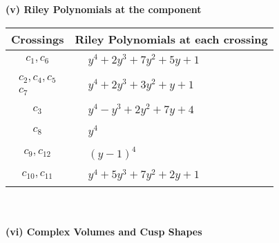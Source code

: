 \documentclass[1p]{elsarticle_modified}
\theoremstyle{definition}
\begin{document}
\newpage\renewcommand{\arraystretch}{1}
\flushleft \textbf{(v) Riley Polynomials at the component}\newline \\
\begin{tabular}{m{50pt}|m{274pt}}
Crossings & \hspace{64pt}Riley Polynomials at each crossing \\
\hline $$\begin{aligned}c_{1},c_{6}\end{aligned}$$&$\begin{aligned}
&y^4+2 y^3+7 y^2+5 y+1
\end{aligned}$\\
\hline $$\begin{aligned}c_{2},c_{4},c_{5}\\c_{7}\end{aligned}$$&$\begin{aligned}
&y^4+2 y^3+3 y^2+y+1
\end{aligned}$\\
\hline $$\begin{aligned}c_{3}\end{aligned}$$&$\begin{aligned}
&y^4- y^3+2 y^2+7 y+4
\end{aligned}$\\
\hline $$\begin{aligned}c_{8}\end{aligned}$$&$\begin{aligned}
&y^4
\end{aligned}$\\
\hline $$\begin{aligned}c_{9},c_{12}\end{aligned}$$&$\begin{aligned}
&(y-1)^4
\end{aligned}$\\
\hline $$\begin{aligned}c_{10},c_{11}\end{aligned}$$&$\begin{aligned}
&y^4+5 y^3+7 y^2+2 y+1
\end{aligned}$\\
\hline
\end{tabular}\\~\\
\newpage\flushleft \textbf{(vi) Complex Volumes and Cusp Shapes}
\end{document}
